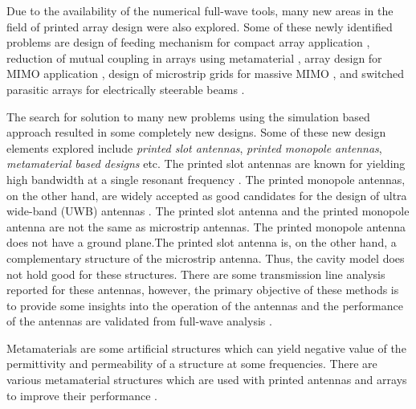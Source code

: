 Due to the availability of the numerical full-wave tools, many new areas in the field of printed array design were also explored. Some of these newly identified problems are design of feeding mechanism for compact array application \cite{CompFeed01, CompFeed02}, reduction of mutual coupling in arrays using metamaterial \cite{mcEBG, mcCSRR, mcFSRR, mimoSRR}, array design for MIMO application \cite{mimoConformal, mimoDualBand}, design of microstrip grids for massive MIMO \cite{mimoSRR, mimoRenonf}, and switched parasitic arrays for electrically steerable beams \cite{spa01,spaMems}.

The search for solution to many new problems using the simulation based approach resulted in some completely new designs. Some of these new design elements explored include \emph{printed slot antennas}, \emph{printed monopole antennas}, \emph{metamaterial based designs} etc. The printed slot antennas are known for yielding high bandwidth at a single resonant frequency \cite{PSA1}. The printed monopole antennas, on the other hand, are widely accepted as good candidates for the design of ultra wide-band (UWB) antennas \cite{PMA01}. The printed slot antenna and the printed monopole antenna are not the same as microstrip antennas. The printed monopole antenna does not have a ground plane.The printed slot antenna is, on the other hand, a complementary structure of the microstrip antenna. Thus, the cavity model does not hold good for these structures. There are some transmission line analysis reported for these antennas, however, the primary objective of these methods is to provide some insights into the operation of the antennas and the performance of the antennas are validated from full-wave analysis \cite{slotAnalysis, pmaCSRR}.

Metamaterials are some artificial structures which can yield negative value of the permittivity and permeability of a structure at some frequencies. There are various metamaterial structures which are used with printed antennas and arrays to improve their performance \cite{mtmReview1, mtmReview2}.

